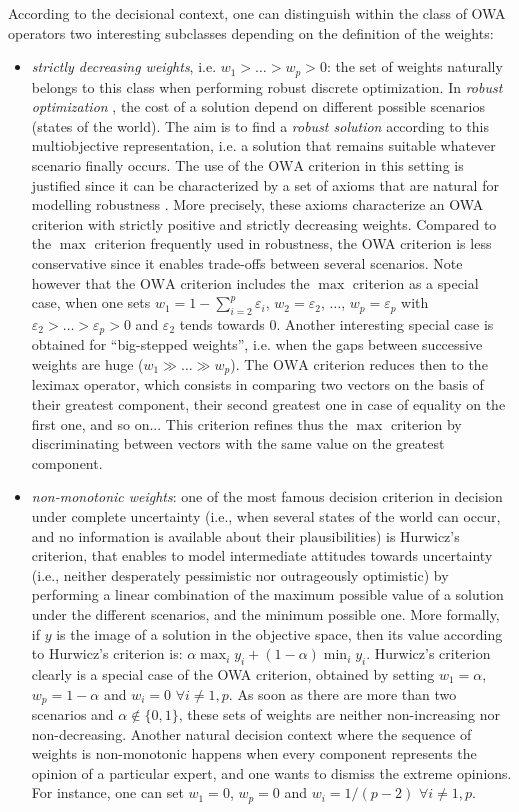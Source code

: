 \documentclass[final,3p,times]{elsarticle}
\newcommand{\owa}{\mbox{OWA}}
\begin{document}
According to the decisional context, one can distinguish within the class of OWA operators two interesting subclasses depending on the definition of the weights:
\begin{itemize}
\item \emph{strictly decreasing weights}, i.e. $w_1 > \ldots > w_p >
  0$: the set of weights naturally belongs to this class when
  performing robust discrete optimization. In \emph{robust
    optimization} \cite{KouvY97}, the cost of a solution depend on
  different possible scenarios (states of the world). The aim is to
  find a \emph{robust solution} according to this multiobjective
  representation, i.e. a solution that remains suitable whatever
  scenario finally occurs. The use of the $\owa$ criterion in this setting is justified since it can be characterized by a set of axioms that are natural for modelling robustness \cite{PernS03}. More precisely, these axioms characterize an OWA criterion with strictly positive and strictly decreasing weights. Compared to
  the $\max$ criterion frequently used in robustness, the OWA
  criterion is less conservative since it enables trade-offs between
  several scenarios. Note however that the $\owa$ criterion includes
  the $\max$ criterion as a special case, when one sets
  $w_1=1-\sum_{i=2}^p \varepsilon_i$, $w_2=\varepsilon_2$, $\ldots$,
  $w_p=\varepsilon_p$ with $\varepsilon_2 > \ldots > \varepsilon_p >0$
  and $\varepsilon_2$ tends towards $0$. Another interesting special
  case is obtained for ``big-stepped weights'', i.e. when the gaps
  between successive weights are huge ($w_1 \gg \ldots \gg w_p$). The
  $\owa$ criterion reduces then to the leximax operator, which
  consists in comparing two vectors on the basis of their greatest
  component, their second greatest one in case of equality on the
  first one, and so on... This criterion refines thus the $\max$
  criterion by discriminating between vectors with the same value on
  the greatest component.
\item \emph{non-monotonic weights}: one of the most famous decision criterion in decision under complete uncertainty (i.e., when several states of the world can occur, and no information is available about their plausibilities) is Hurwicz's criterion, that enables to model intermediate attitudes towards uncertainty (i.e., neither desperately pessimistic nor outrageously optimistic) by performing a linear combination of the maximum possible value of a solution under the different scenarios, and the minimum possible one. More formally, if $y$ is the image of a solution in the objective space, then its value according to Hurwicz's criterion is: $\alpha \max_i y_i + (1-\alpha) \min_i y_i$. Hurwicz's criterion clearly is a special case of the OWA criterion, obtained by setting $w_1=\alpha$, $w_p=1-\alpha$ and $w_i=0$ $\forall i\neq 1,p$. As soon as there are more than two scenarios and $\alpha \not\in \{0,1\}$, these sets of weights are neither non-increasing nor non-decreasing. Another natural decision context where the sequence of weights is non-monotonic happens when every component represents the opinion of a particular expert, and one wants to dismiss the extreme opinions. For instance, one can set $w_1=0$, $w_p=0$ and $w_i=1/(p-2)$ $\forall i\neq 1,p$.

\end{itemize}
\end{document}
